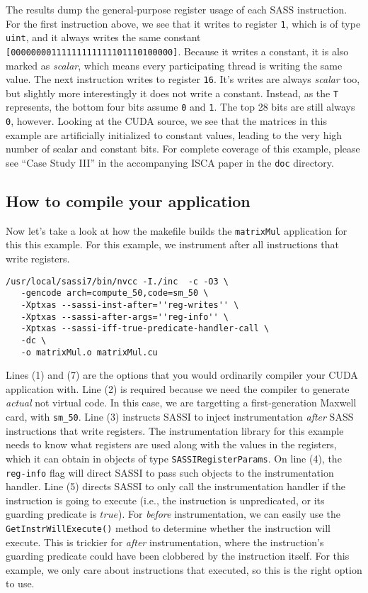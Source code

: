 The results dump the general-purpose register usage of each SASS
instruction.  For the first instruction above, we see that it writes
to register \texttt{1}, which is of type \texttt{uint}, and it always
writes the same constant \texttt{[00000000111111111111101110100000]}.
Because it writes a constant, it is also marked as \emph{scalar},
which means every participating thread is writing the same value.  The
next instruction writes to register \texttt{16}.  It's writes are
always \emph{scalar} too, but slightly more interestingly it does not
write a constant.  Instead, as the \texttt{T} represents, the bottom
four bits assume \texttt{0} and \texttt{1}.  The top 28 bits are still
always \texttt{0}, however.  Looking at the CUDA source, we see that
the matrices in this example are artificially initialized to constant
values, leading to the very high number of scalar and constant bits.
For complete coverage of this example, please see ``Case Study III''
in the accompanying ISCA paper in the \texttt{doc} directory.

\subsection{How to compile your application}

Now let's take a look at how the makefile builds the
\texttt{matrixMul} application for this this example.  For this
example, we instrument after all instructions that write registers.
\begin{lstlisting}[style=BashInputStyle]
/usr/local/sassi7/bin/nvcc -I./inc  -c -O3 \
   -gencode arch=compute_50,code=sm_50 \
   -Xptxas --sassi-inst-after=''reg-writes'' \
   -Xptxas --sassi-after-args=''reg-info'' \
   -Xptxas --sassi-iff-true-predicate-handler-call \
   -dc \
   -o matrixMul.o matrixMul.cu
\end{lstlisting}

Lines (1) and (7) are the options that you would ordinarily compiler
your CUDA application with.  Line (2) is required because we need the
compiler to generate \emph{actual} not virtual code.  In this case, we
are targetting a first-generation Maxwell card, with \texttt{sm\_50}.
Line (3) instructs SASSI to inject instrumentation \emph{after} SASS
instructions that write registers.  The instrumentation library for
this example needs to know what registers are used along with the
values in the registers, which it can obtain in objects of type
\texttt{SASSIRegisterParams}.  On line (4), the \texttt{reg-info} flag
will direct SASSI to pass such objects to the instrumentation
handler. Line (5) directs SASSI to only call the instrumentation
handler if the instruction is going to execute (i.e., the instruction
is unpredicated, or its guarding predicate is $true$).  For
\emph{before} instrumentation, we can easily use the
\texttt{GetInstrWillExecute()} method to determine whether the
instruction will execute.  This is trickier for \emph{after}
instrumentation, where the instruction's guarding predicate could have
been clobbered by the instruction itself.  For this example, we only
care about instructions that executed, so this is the right option to
use.

